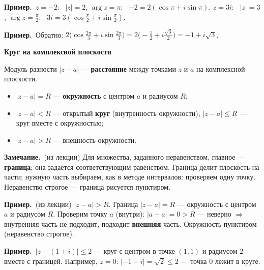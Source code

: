 \documentclass[a4paper,11pt]{article}
\newcommand{\prim}{\par\smallskip\noindent\textbf{\textcolor{teoc!80!black}{Пример.}}\ }
\newcommand{\zam}{\par\smallskip\noindent\textbf{\textcolor{zamc}{Замечание.}}\ }
\newcommand{\podr}[1]{\par\needspace{8\baselineskip}\medskip
  {\large\bfseries\textcolor{oprc!80!black}{#1}}\par\nopagebreak\smallskip}
\begin{document}
\prim $z = -2$: \ $|z| = 2$, $\arg z = \pi$: \ $-2 = 2(\cos\pi + i\sin\pi)$. \quad
$z = 3i$: \ $|z| = 3$, $\arg z = \frac\pi2$: \ $3i = 3(\cos\frac\pi2 + i\sin\frac\pi2)$.

\prim Обратно: $2\bigl(\cos\frac{2\pi}{3} + i\sin\frac{2\pi}{3}\bigr) = 2\bigl(-\frac12 + i\frac{\sqrt3}{2}\bigr) = -1 + i\sqrt3$.

\podr{Круг на комплексной плоскости}

Модуль разности $|z - a|$ --- \textbf{расстояние} между точками $z$ и $a$ на комплексной плоскости.

\begin{itemize}[leftmargin=*]
  \item $|z - a| = R$ --- \textbf{окружность} с центром $a$ и радиусом $R$;
  \item $|z - a| < R$ --- открытый \textbf{круг} (внутренность окружности), $|z - a| \le R$ --- круг вместе с окружностью;
  \item $|z - a| > R$ --- внешность окружности.
\end{itemize}

\zam (из лекции) Для множества, заданного неравенством, главное --- \textbf{граница}; она задаётся соответствующим равенством.
Граница делит плоскость на части; нужную часть выбираем, как в методе интервалов: проверяем одну точку.
Неравенство строгое --- граница рисуется пунктиром.

\begin{minipage}[c]{0.56\linewidth}
\prim (из лекции) $|z - a| > R$. Граница $|z - a| = R$ --- окружность с центром $a$ и радиусом $R$. Проверим точку $a$ (внутри):
$|a - a| = 0 > R$ --- неверно $\Rightarrow$ внутренняя часть не подходит, подходит \textbf{внешняя} часть.
Окружность пунктиром (неравенство строгое).

\medskip
\prim $|z - (1 + i)| \le 2$ --- круг с центром в точке $(1, 1)$ и радиусом $2$ вместе с границей.
Например, $z = 0$: $|{-1} - i| = \sqrt2 \le 2$ --- точка $0$ лежит в круге.
\end{minipage}\hfill
\begin{minipage}[c]{0.4\linewidth}
\centering
{}
\end{minipage}
\end{document}
